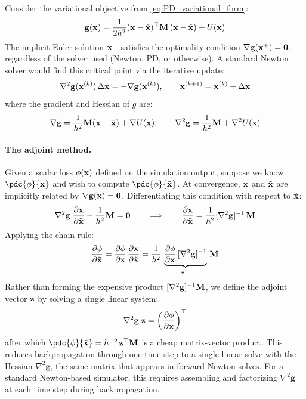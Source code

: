 Consider the variational objective from \eqref{eq:PD_variational_form}:
\begin{equation}
    \mathbf{g}(\mathbf{x}) = \frac{1}{2h^2}(\mathbf{x} - \tilde{\mathbf{x}})^\top\mathbf{M}\,(\mathbf{x} - \tilde{\mathbf{x}}) + U(\mathbf{x})
\end{equation}
The implicit Euler solution $\mathbf{x}^+$ satisfies the optimality condition $\nabla \mathbf{g}(\mathbf{x}^+) = \mathbf{0}$, regardless of the solver used (Newton, PD, or otherwise). A standard Newton solver would find this critical point via the iterative update:
\begin{equation*}
    \nabla^2 \mathbf{g}(\mathbf{x}^{(k)})\,\Delta \mathbf{x} = -\nabla \mathbf{g}(\mathbf{x}^{(k)}), 
    \qquad
    \mathbf{x}^{(k+1)} = \mathbf{x}^{(k)} + \Delta \mathbf{x}
\end{equation*}
where the gradient and Hessian of $g$ are:
\begin{equation}
\label{eq:PD_variational_function_jacobian_hessian}
    \nabla \mathbf{g} = \frac{1}{h^2}\mathbf{M}(\mathbf{x} - \tilde{\mathbf{x}}) + \nabla U(\mathbf{x}),
    \qquad
    \nabla^2 \mathbf{g} = \frac{1}{h^2}\mathbf{M} + \nabla^2 U(\mathbf{x})
\end{equation}

\paragraph{The adjoint method.} Given a scalar loss $\phi(\mathbf{x})$ defined on the simulation output, suppose we know $\pdc{\phi}{\x}$ and wish to compute $\pdc{\phi}{\tilde{\x}}$. At convergence, $\mathbf{x}$ and $\tilde{\mathbf{x}}$ are implicitly related by $\nabla \mathbf{g}(\mathbf{x}) = \mathbf{0}$. Differentiating this condition with respect to $\tilde{\mathbf{x}}$:
\begin{equation}
    \nabla^2 \mathbf{g} \;\frac{\partial \mathbf{x}}{\partial \tilde{\mathbf{x}}} - \frac{1}{h^2}\mathbf{M} = \mathbf{0}
    \qquad\Longrightarrow\qquad
    \frac{\partial \mathbf{x}}{\partial \tilde{\mathbf{x}}} = \frac{1}{h^2}[\nabla^2 \mathbf{g}]^{-1}\,\mathbf{M}
\end{equation}
Applying the chain rule:
\begin{equation}
    \frac{\partial \phi}{\partial \tilde{\mathbf{x}}} = 
    \frac{\partial \phi}{\partial \mathbf{x}}\,\frac{\partial \mathbf{x}}{\partial \tilde{\mathbf{x}}} =
    \frac{1}{h^2}\,
    \underbrace{\frac{\partial \phi}{\partial \mathbf{x}}\,[\nabla^2 \mathbf{g}]^{-1}}_{\mathbf{z}^\top}\,
    \mathbf{M}
\end{equation}
Rather than forming the expensive product $[\nabla^2 \mathbf{g}]^{-1}\mathbf{M}$, we define the adjoint vector $\mathbf{z}$ by solving a single linear system:
\begin{equation}\label{eq:PD_adjoint_system}
    \nabla^2 \mathbf{g}\;\mathbf{z} = \left(\frac{\partial \phi}{\partial \mathbf{x}}\right)^\top
\end{equation}
after which $\pdc{\phi}{\tilde{\x}} = h^{-2}\,\z^\top\M$ is a cheap matrix-vector product. This reduces backpropagation through one time step to a single linear solve with the Hessian $\nabla^2 \mathbf{g}$, the same matrix that appears in forward Newton solves. For a standard Newton-based simulator, this requires assembling and factorizing $\nabla^2 \mathbf{g}$ at each time step during backpropagation.

